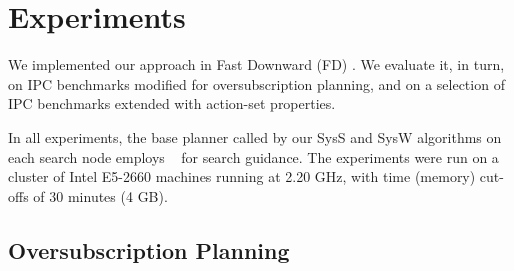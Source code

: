 

\newcommand{\scatterplotsize}{8cm}
\newcommand{\scatterplotxlabelshift}{1.5ex}
\newcommand{\scatterplotylabelshift}{-3ex}




\section{Experiments}
\label{experiments}






We implemented our approach in Fast Downward
(FD) \cite{helmert:jair-06}. We evaluate it, in turn, on IPC
benchmarks modified for oversubscription planning, and on a selection
of IPC benchmarks extended with action-set properties.

In all experiments, the base planner called by our SysS and SysW
algorithms on each search node
employs \hff\ \cite{hoffmann:nebel:jair-01} for search guidance.
%
%
The experiments were run on a cluster of Intel E5-2660 machines
running at 2.20 GHz, with time (memory) cut-offs of 30 minutes (4
GB).



 
\subsection{Oversubscription Planning}

%

